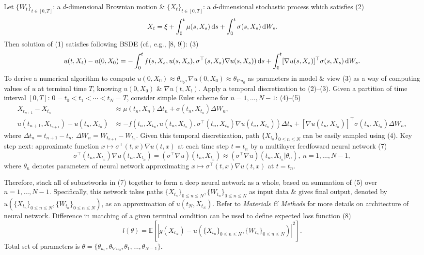 \documentclass{article}
\begin{document}
\begin{itemize}
	Let $\{W_t\}_{t\in[0,T]}$: a $d$-dimensional Brownian motion \& $\{X_t\}_{t\in[0,T]}$: a $d$-dimensional stochastic process which satisfies (2)
	\begin{equation*}
		X_t = \xi + \int_0^t \mu(s,X_s)\,{\rm d}s + \int_0^t \sigma(s,X_s)\,{\rm d}W_s.
	\end{equation*}
	Then solution of (1) satisfies following BSDE (cf., e.g., [8, 9]): (3)
	\begin{equation*}
		u(t,X_t) - u(0,X_0) = -\int_0^t f(s,X_s,u(s,X_s),\sigma^\top(s,X_s)\nabla u(s,X_s))\,{\rm d}s + \int_0^t [\nabla u(s,X_s)]^\top\sigma(s,X_s)\,{\rm d}W_s.
	\end{equation*}
	To derive a numerical algorithm to compute $u(0,X_0)\approx\theta_{u_0},\nabla u(0,X_0)\approx\theta_{\nabla u_0}$ as parameters in model \& view (3) as a way of computing values of $u$ at terminal time $T$, knowing $u(0,X_0)$ \& $\nabla u(t,X_t)$. Apply a temporal discretization to (2)--(3). Given a partition of time interval $[0,T]$: $0 = t_0 < t_1 < \cdots < t_N = T$, consider simple Euler scheme for $n = 1,\ldots,N - 1$: (4)--(5)
	\begin{align*}
		X_{t_{n+1}} - X_{t_n}&\approx\mu(t_n,X_n)\Delta t_n + \sigma(t_n,X_{t_n})\Delta W_n,\\
		u(t_{n+1},X_{t_{n+1}}) - u(t_n,X_{t_n})&\approx-f(t_n,X_{t_n},u(t_n,X_{t_n}),\sigma^\top(t_n,X_{t_n})\nabla u(t_n,X_{t_n}))\Delta t_n + [\nabla u(t_n,X_{t_n})]^\top\sigma(t_n,X_{t_n})\Delta W_n,
	\end{align*}
	where $\Delta t_n = t_{n+1} - t_n$, $\Delta W_n = W_{t_{n+1}} - W_{t_n}$. Given this temporal discretization, path $\{X_{t_n}\}_{0\le n\le N}$ can be easily sampled using (4). Key step next: approximate function $x\mapsto\sigma^\top(t,x)\nabla u(t,x)$ at each time step $t = t_n$ by a multilayer feedfoward neural network (7)
	\begin{equation*}
		\sigma^\top(t_n,X_{t_n})\nabla u(t_n,X_{t_n}) = (\sigma^\top\nabla u)(t_n,X_{t_n})\approx(\sigma^\top\nabla u)(t_n,X_{t_n}|\theta_n),\ n = 1,\ldots,N - 1,
	\end{equation*}
	where $\theta_n$ denotes parameters of neural network approximating $x\mapsto\sigma^\top(t,x)\nabla u(t,x)$ at $t = t_n$.
	
	Therefore, stack all of subnetworks in (7) together to form a deep neural network as a whole, based on summation of (5) over $n = 1,\ldots,N - 1$. Specifically, this network takes paths $\{X_{t_n}\}_{0\le n\le N},\{W_{t_n}\}_{0\le n\le N}$ as input data \& gives final output, denoted by $\hat{u}(\{X_{t_n}\}_{0\le n\le N},\{W_{t_n}\}_{0\le n\le N})$, as an approximation of $u(t_N,X_{t_N})$. Refer to {\it Materials \& Methods} for more details on architecture of neural network. Difference in matching of a given terminal condition can be used to define expected loss function (8)
	\begin{equation*}
		l(\theta) = \mathbb{E}\left[|g(X_{t_N}) - \hat{u}(\{X_{t_n}\}_{0\le n\le N},\{W_{t_n}\}_{0\le n\le N})|^2\right].
	\end{equation*}
	Total set of parameters is $\theta = \{\theta_{u_0},\theta_{\nabla u_0},\theta_1,\ldots,\theta_{N-1}\}$.
	

\end{itemize}
\end{document}
